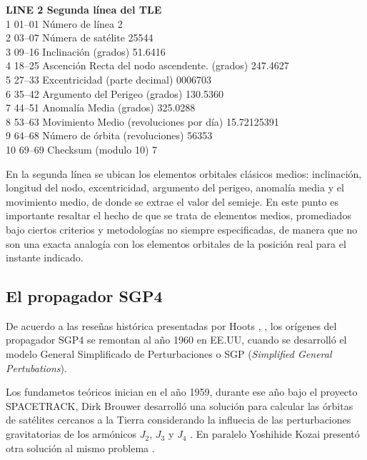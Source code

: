 {\begin{center}
{{{\bf{LINE 2 Segunda l\'inea del TLE}}\\
1   01–01   Número de línea    2\\
2   03–07   Númera de satélite 25544\\
3   09–16   Inclinación (grados)     51.6416\\
4   18–25   Ascención Recta del nodo ascendente. (grados)   247.4627\\
5   27–33   Excentricidad (parte decimal)  0006703\\
6   35–42   Argumento del Perigeo (grados) 130.5360\\
7   44–51   Anomalía Media (grados) 325.0288\\
8   53–63   Movimiento Medio (revoluciones por día) 15.72125391\\
9   64–68   Número de órbita (revoluciones)  56353\\
10  69–69   Checksum (modulo 10)  7\\
}}
\end{center}

En la segunda l\'inea se ubican los elementos orbitales cl\'asicos medios: inclinaci\'on, longitud del nodo, excentricidad, argumento del perigeo, anomal\'ia media y el movimiento medio, de donde se extrae el valor del semieje. En este punto es importante resaltar el hecho de que se trata de elementos medios, promediados bajo ciertos criterios y metodologías no siempre especificadas, de manera que no son una exacta analog\'ia con los elementos orbitales de la posici\'on real para el instante indicado.

\subsection{El propagador SGP4}\label{subsec:sgp4model}
De acuerdo a las rese\~nas hist\'orica presentadas por Hoots \citep{hootshistoria}, \citep{hoots2004history}, los or\'igenes del propagador SGP4 se remontan al a\~no 1960 en EE.UU, cuando se desarroll\'o el modelo General Simplificado de Perturbaciones o SGP ({\it{Simplified General Pertubations}}).

Los fundametos te\'oricos inician en el a\~no 1959, durante ese a\~no bajo el proyecto SPACETRACK, Dirk Brouwer desarroll\'o una soluci\'on para calcular las \'orbitas de sat\'elites cercanos a la Tierra considerando la influecia de las perturbaciones gravitatorias de los arm\'onicos $J_{2}$, $J_{3}$ y $J_{4}$ \citep{brouwer1959solution}. En paralelo Yoshihide Kozai present\'o otra soluci\'on al mismo problema \citep{kozai1962second}.

}
